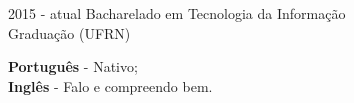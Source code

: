 \documentclass[9pt]{developercv}
\begin{document}
	\begin{entrylist}
		\entry
			{2015 - atual}
			{Bacharelado em Tecnologia da Informação\\
				\footnotesize{Graduação}}
			{(UFRN)}
			{}
	\end{entrylist}


	\begin{minipage}[t]{1\textwidth}
		\textbf{Português} - Nativo;\\
		\textbf{Inglês} - Falo e compreendo bem.
	\end{minipage}
\end{document}
